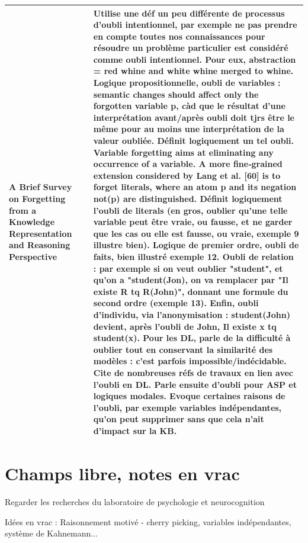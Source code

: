 \documentclass[french]{article}
\begin{document}
\begin{table}[ht!]
\begin{center}
\begin{tabular}{|p{}|p{}|p{}|}
            A Brief Survey on Forgetting from a Knowledge Representation and Reasoning Perspective \cite{timm_intentional_2018}
            &
            & Utilise une déf un peu différente de processus d'oubli intentionnel, par exemple ne pas prendre en compte toutes nos connaissances pour résoudre un problème particulier est considéré comme oubli intentionnel. Pour eux, abstraction = red whine and white whine merged to whine.
            Logique propositionnelle, oubli de variables : semantic changes should affect only the forgotten variable p, càd que le résultat d'une interprétation avant/après oubli doit tjrs être le même pour au moins une interprétation de la valeur oubliée. Définit logiquement un tel oubli. Variable forgetting aims at eliminating any occurrence of a variable. A more fine‑grained extension considered by Lang et al. [60] is to forget literals, where an atom p and its negation not(p) are distinguished. Définit logiquement l'oubli de literals (en gros, oublier qu'une telle variable peut être vraie, ou fausse, et ne garder que les cas ou elle est fausse, ou vraie, exemple 9 illustre bien).
            Logique de premier ordre, oubli de faits, bien illustré exemple 12.
            Oubli de relation : par exemple si on veut oublier "student", et qu'on a "student(Jon), on va remplacer par "Il existe R tq R(John)", donnant une formule du second ordre (exemple 13).
            Enfin, oubli d'individu, via l'anonymisation : student(John) devient, après l'oubli de John, Il existe x tq student(x).
            Pour les DL, parle de la difficulté à oublier tout en conservant la similarité des modèles : c'est parfois impossible/indécidable. Cite de nombreuses réfs de travaux en lien avec l'oubli en DL. Parle ensuite d'oubli pour ASP et logiques modales.
            Evoque certaines raisons de l'oubli, par exemple variables indépendantes, qu'on peut supprimer sans que cela n'ait d'impact sur la KB.
            \\
            \hline


        \end{tabular}
    \end{center}
    \end{table}

    \section{Champs libre, notes en vrac}

    Regarder les recherches du laboratoire de psychologie et neurocognition

    Idées en vrac :
    Raisonnement motivé - cherry picking, variables indépendantes, système de Kahnemann...

    
    \nocite{*}
    
    
\end{document}
